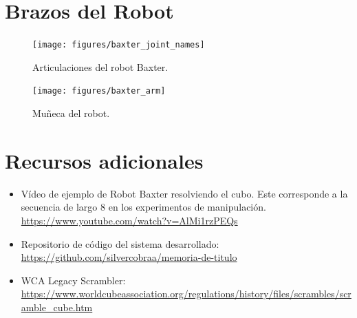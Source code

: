 \section*{Brazos del Robot}
\begin{figure}[h!]
	\centering
	\texttt{[image: figures/baxter\_joint\_names]}
	\caption{Articulaciones del robot Baxter.}
	\label{baxterjoints}
\end{figure}
\begin{figure}[h!]
	\centering
	\texttt{[image: figures/baxter\_arm]}
	\caption{Muñeca del robot.}
	\label{baxterjoints}
\end{figure}

\newpage
\section*{Recursos adicionales}

\begin{itemize}
	\item Vídeo de ejemplo de Robot Baxter resolviendo el cubo. Este corresponde a la secuencia de largo 8 en los experimentos de manipulación.
	\url{https://www.youtube.com/watch?v=AlMi1rzPEQs}
	\item Repositorio de código del sistema desarrollado: \url{https://github.com/silvercobraa/memoria-de-titulo}
	\item WCA Legacy Scrambler: \url{https://www.worldcubeassociation.org/regulations/history/files/scrambles/scramble_cube.htm}
\end{itemize}
